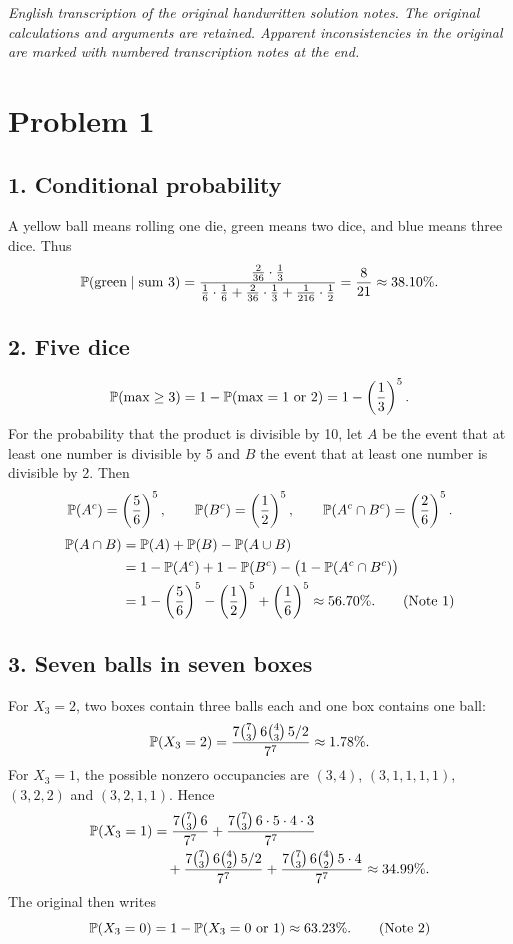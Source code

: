 \documentclass[11pt,a4paper]{article}
\begin{document}
\noindent\emph{English transcription of the original handwritten solution notes. The original calculations and arguments are retained. Apparent inconsistencies in the original are marked with numbered transcription notes at the end.}

\section*{Problem 1}
\subsection*{1. Conditional probability}
A yellow ball means rolling one die, green means two dice, and blue means three dice. Thus
\[
\P(\text{green}\mid\text{sum }3)
=\frac{\frac2{36}\cdot\frac13}
{\frac16\cdot\frac16+\frac2{36}\cdot\frac13+\frac1{216}\cdot\frac12}
=\frac8{21}\approx38.10\%.
\]
\subsection*{2. Five dice}
\[
\P(\max\ge3)=1-\P(\max=1\text{ or }2)=1-\left(\frac13\right)^5.
\]
For the probability that the product is divisible by 10, let $A$ be the event that at least one number is divisible by 5 and $B$ the event that at least one number is divisible by 2. Then
\[
\P(A^c)=\left(\frac56\right)^5,\qquad
\P(B^c)=\left(\frac12\right)^5,\qquad
\P(A^c\cap B^c)=\left(\frac26\right)^5.
\]
\begin{align*}
\P(A\cap B)&=\P(A)+\P(B)-\P(A\cup B)\\
&=1-\P(A^c)+1-\P(B^c)-\bigl(1-\P(A^c\cap B^c)\bigr)\\
&=1-\left(\frac56\right)^5-\left(\frac12\right)^5
+\left(\frac16\right)^5\approx56.70\%.\tag{Note 1}
\end{align*}

\subsection*{3. Seven balls in seven boxes}
For $X_3=2$, two boxes contain three balls each and one box contains one ball:
\[
\P(X_3=2)=\frac{7\binom73\,6\binom43\,5/2}{7^7}\approx1.78\%.
\]
For $X_3=1$, the possible nonzero occupancies are
$(3,4)$, $(3,1,1,1,1)$, $(3,2,2)$ and $(3,2,1,1)$. Hence
\begin{align*}
\P(X_3=1)&=\frac{7\binom73\,6}{7^7}
+\frac{7\binom73\,6\cdot5\cdot4\cdot3}{7^7}\\
&\quad+\frac{7\binom73\,6\binom42\,5/2}{7^7}
+\frac{7\binom73\,6\binom42\,5\cdot4}{7^7}
\approx34.99\%.
\end{align*}
The original then writes
\[
\P(X_3=0)=1-\P(X_3=0\text{ or }1)\approx63.23\%.\tag{Note 2}
\]
\end{document}
